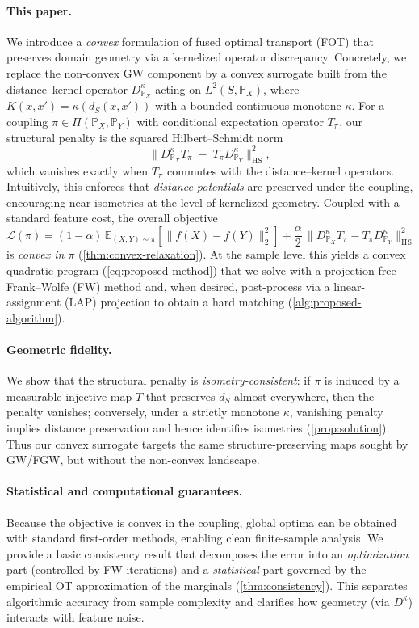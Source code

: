 \documentclass{article}
\begin{document}
\paragraph{This paper.}
We introduce a \emph{convex} formulation of fused optimal transport (FOT) that preserves domain geometry via a kernelized operator discrepancy. Concretely, we replace the non-convex GW component by a convex surrogate built from the distance–kernel operator $D^{\kappa}_{\mathbb{P}_X}$ acting on $L^2(S,\mathbb{P}_X)$, where $K(x,x')=\kappa(d_S(x,x'))$ with a bounded continuous monotone $\kappa$. For a coupling $\pi\in\Pi(\mathbb{P}_X,\mathbb{P}_Y)$ with conditional expectation operator $T_\pi$, our structural penalty is the squared Hilbert–Schmidt norm
\[
\big\| D^{\kappa}_{\mathbb{P}_X} T_\pi \;-\; T_\pi D^{\kappa}_{\mathbb{P}_Y}\big\|_{\mathrm{HS}}^2,
\]
which vanishes exactly when $T_\pi$ commutes with the distance–kernel operators. Intuitively, this enforces that \emph{distance potentials} are preserved under the coupling, encouraging near-isometries at the level of kernelized geometry. Coupled with a standard feature cost, the overall objective
\[
\mathcal{L}(\pi)
=(1-\alpha)\,\mathbb{E}_{(X,Y)\sim\pi}\!\left[\|f(X)-f(Y)\|_2^2\right]
+\frac{\alpha}{2}\,\big\| D^{\kappa}_{\mathbb{P}_X} T_\pi - T_\pi D^{\kappa}_{\mathbb{P}_Y}\big\|_{\mathrm{HS}}^2
\]
is \emph{convex in $\pi$} (\cref{thm:convex-relaxation}). At the sample level this yields a convex quadratic program (\eqref{eq:proposed-method}) that we solve with a projection-free Frank–Wolfe (FW) method and, when desired, post-process via a linear-assignment (LAP) projection to obtain a hard matching (\cref{alg:proposed-algorithm}).

\paragraph{Geometric fidelity.}
We show that the structural penalty is \emph{isometry-consistent}: if $\pi$ is induced by a measurable injective map $T$ that preserves $d_S$ almost everywhere, then the penalty vanishes; conversely, under a strictly monotone $\kappa$, vanishing penalty implies distance preservation and hence identifies isometries (\cref{prop:solution}). Thus our convex surrogate targets the same structure-preserving maps sought by GW/FGW, but without the non-convex landscape.

\paragraph{Statistical and computational guarantees.}
Because the objective is convex in the coupling, global optima can be obtained with standard first-order methods, enabling clean finite-sample analysis. We provide a basic consistency result that decomposes the error into an \emph{optimization} part (controlled by FW iterations) and a \emph{statistical} part governed by the empirical OT approximation of the marginals (\cref{thm:consistency}). This separates algorithmic accuracy from sample complexity and clarifies how geometry (via $D^{\kappa}$) interacts with feature noise.
\end{document}

